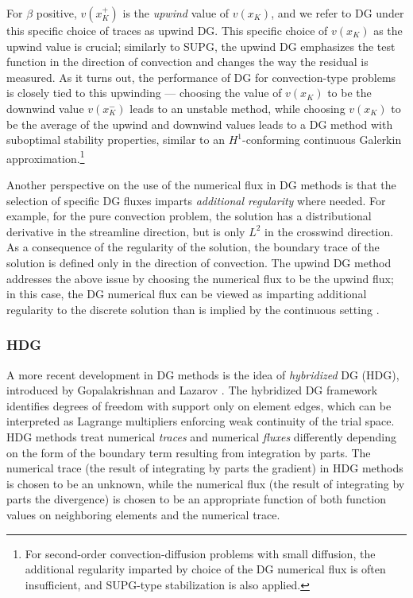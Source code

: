 For $\beta$ positive, $v(x_K^+)$ is the \emph{upwind} value of $v(x_K)$, and we refer to DG under this specific choice of traces as upwind DG.  This specific choice of $v(x_K)$ as the upwind value is crucial; similarly to SUPG, the upwind DG emphasizes the test function in the direction of convection and changes the way the residual is measured.  As it turns out, the performance of DG for convection-type problems is closely tied to this upwinding --- choosing the value of $v(x_K)$ to be the downwind value $v(x_K^-)$ leads to an unstable method, while choosing $v(x_K)$ to be the average of the upwind and downwind values leads to a DG method with suboptimal stability properties, similar to an $H^1$-conforming continuous Galerkin approximation\cite{Brezzi20063293}.\footnote{For second-order convection-diffusion problems with small diffusion, the additional regularity imparted by choice of the DG numerical flux is often insufficient, and SUPG-type stabilization is also applied.}

Another perspective on the use of the numerical flux in DG methods is that the selection of specific DG fluxes imparts \emph{additional regularity} where needed.  For example, for the pure convection problem, the solution has a distributional derivative in the streamline direction, but is only $L^2$ in the crosswind direction. As a consequence of the regularity of the solution, the boundary trace of the solution is defined only in the direction of convection. The upwind DG method addresses the above issue by choosing the numerical flux to be the upwind flux; in this case, the DG numerical flux can be viewed as imparting additional regularity to the discrete solution than is implied by the continuous setting \cite{DPG1,DPG3}.  

\subsubsection{HDG}

A more recent development in DG methods is the idea of \emph{hybridized} DG (HDG), introduced by Gopalakrishnan and Lazarov \cite{hybridDG}. The hybridized DG framework identifies degrees of freedom with support only on element edges, which can be interpreted as Lagrange multipliers enforcing weak continuity of the trial space. HDG methods treat numerical \emph{traces} and numerical \emph{fluxes} differently depending on the form of the boundary term resulting from integration by parts. The numerical trace (the result of integrating by parts the gradient) in HDG methods is chosen to be an unknown, while the numerical flux (the result of integrating by parts the divergence) is chosen to be an appropriate function of both function values on neighboring elements and the numerical trace. 


